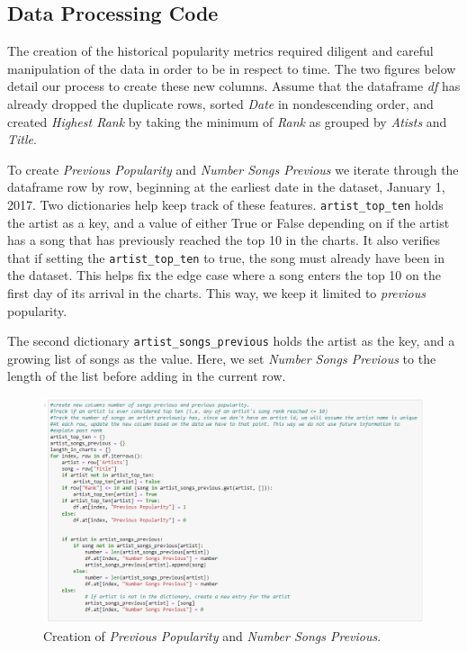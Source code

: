 \documentclass{article}
\begin{document}
\begin{appendices}
\section{Data Processing Code}
The creation of the historical popularity metrics required diligent and careful manipulation of the data in order to be in respect to time. The two figures below detail our process to create these new columns. Assume that the dataframe \textit{df} has already dropped the duplicate rows, sorted \textit{Date} in nondescending order, and created \textit{Highest Rank} by taking the minimum of \textit{Rank} as grouped by \textit{Atists} and \textit{Title}.

To create \textit{Previous Popularity} and \textit{Number Songs Previous} we iterate through the dataframe row by row, beginning at the earliest date in the dataset, January 1, 2017. Two dictionaries help keep track of these features. \texttt{artist\_top\_ten} holds the artist as a key, and a value of either True or False depending on if the artist has a song that has previously reached the top 10 in the charts. It also verifies that if setting the \texttt{artist\_top\_ten} to true, the song must already have been in the dataset. This helps fix the edge case where a song enters the top 10 on the first day of its arrival in the charts. This way, we keep it limited to \textit{previous} popularity.

The second dictionary \texttt{artist\_songs\_previous} holds the artist as the key, and a growing list of songs as the value. Here, we set \textit{Number Songs Previous} to the length of the list before adding in the current row. 

\begin{figure}[H]
  \centering
  \includegraphics[width=0.9\linewidth]{previousPopCode.png}
  \caption{Creation of \textit{Previous Popularity} and \textit{Number Songs Previous}.}
  \label{fig:dist}
\end{figure}


\end{appendices}
\end{document}
